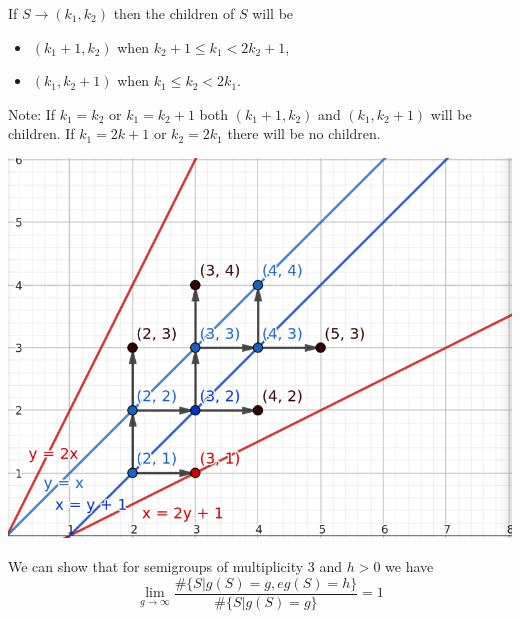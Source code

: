 If $S \to (k_1, k_2)$ then the children of $S$ will be 
\begin{itemize}
    \item $(k_1 + 1, k_2)$ when $k_2 + 1 \leq k_1 < 2k_2 + 1$,
    \item $(k_1, k_2 + 1)$ when $k_1 \leq k_2 < 2k_1$.
\end{itemize}
Note: If $k_1=k_2$ or $k_1 = k_2 + 1$ both $(k_1 + 1, k_2)$ and $(k_1, k_2 + 1)$ will be children. If $k_1 = 2k+1$ or $k_2 = 2k_1$ there will be no children.

\includegraphics[scale=0.3]{Max/images/Screenshot from 2024-07-15 13-01-52.png}

We can show that for semigroups of multiplicity 3 and $h > 0$ we have 
$$\lim_{g \to \infty} \frac{\# \{S | g(S) = g, eg(S) = h \}}{\# \{ S | g(S) = g\}} = 1$$
